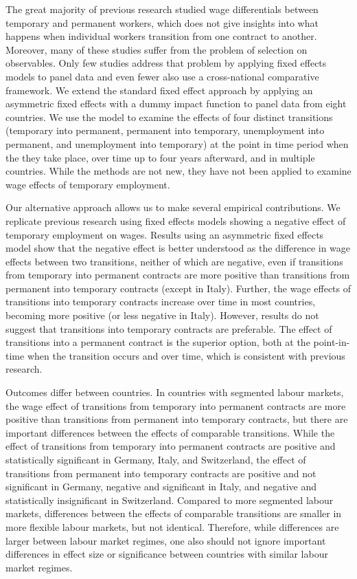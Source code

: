 \documentclass[12pt]{article}
\begin{document}
The great majority of previous research studied wage differentials between temporary and permanent workers, which does not give insights into what happens when individual workers transition from one contract to another. Moreover, many of these studies suffer from the problem of selection on observables. Only few studies address that problem by applying fixed effects models to panel data and even fewer also use a cross-national comparative framework.  We extend the standard fixed effect approach by applying an asymmetric fixed effects with a dummy impact function to panel data from eight countries.  We use the model to examine the effects of four distinct transitions (temporary into permanent, permanent into temporary, unemployment into permanent, and unemployment into temporary) at the point in time period when the they take place, over time up to four years afterward, and in multiple countries.  While the methods are not new, they have not been applied to examine wage effects of temporary employment.

Our alternative approach allows us to make several empirical contributions.  We replicate previous research using fixed effects models showing a negative effect of temporary employment on wages.  Results using an asymmetric fixed effects model show that the negative effect is better understood as the difference in wage effects between two transitions, neither of which are negative, even if transitions from temporary into permanent contracts are more positive than transitions from permanent into temporary contracts (except in Italy).  Further, the wage effects of transitions into temporary contracts increase over time in most countries, becoming more positive (or less negative in Italy).  However, results do not suggest that transitions into temporary contracts are preferable.  The effect of transitions into a permanent contract is the superior option, both at the point-in-time when the transition occurs and over time, which is consistent with previous research.  

Outcomes differ between countries.  In countries with segmented labour markets, the wage effect of transitions from temporary into permanent contracts are more positive than transitions from permanent into temporary contracts, but there are important differences between the effects of comparable transitions.  While the effect of transitions from temporary into permanent contracts are positive and statistically significant in Germany, Italy, and Switzerland, the effect of transitions from permanent into temporary contracts are positive and not significant in Germany, negative and significant in Italy, and negative and statistically insignificant in Switzerland.  Compared to more segmented labour markets, differences between the effects of comparable transitions are smaller in more flexible labour markets, but not identical.  Therefore, while differences are larger between labour market regimes, one also should not ignore important differences in effect size or significance between countries with similar labour market regimes.  
\end{document}

